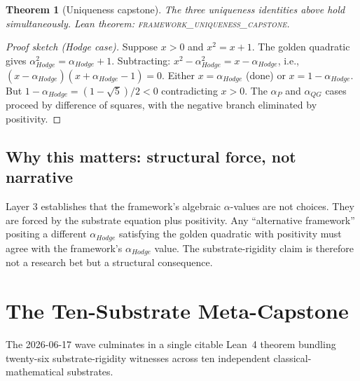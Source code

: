 \documentclass[11pt,a4paper]{amsart}
\theoremstyle{plain}
\newtheorem{theorem}{Theorem}[section]
\theoremstyle{definition}
\newcommand{\aP}{\alpha_{P}}
\newcommand{\aHodge}{\alpha_{Hodge}}
\newcommand{\aQG}{\alpha_{QG}}
\begin{document}
\begin{theorem}[Uniqueness capstone]
The three uniqueness identities above hold simultaneously. Lean
theorem: \textsc{framework\_uniqueness\_capstone}.
\end{theorem}

\begin{proof}[Proof sketch (Hodge case)]
Suppose $x > 0$ and $x^{2} = x + 1$. The golden quadratic gives
$\aHodge^{2} = \aHodge + 1$. Subtracting:
$x^{2} - \aHodge^{2} = x - \aHodge$, i.e.,
$(x - \aHodge)(x + \aHodge - 1) = 0$. Either $x = \aHodge$ (done) or
$x = 1 - \aHodge$. But $1 - \aHodge = (1 - \sqrt{5})/2 < 0$
contradicting $x > 0$. The $\aP$ and $\aQG$ cases proceed by
difference of squares, with the negative branch eliminated by
positivity.
\end{proof}

\subsection{Why this matters: structural force, not narrative}
Layer 3 establishes that the framework's algebraic $\alpha$-values are
not choices. They are forced by the substrate equation plus positivity.
Any ``alternative framework'' positing a different $\aHodge$
satisfying the golden quadratic with positivity must agree with the
framework's $\aHodge$ value. The substrate-rigidity claim is therefore
not a research bet but a structural consequence.

\section{The Ten-Substrate Meta-Capstone}
\label{sec:meta}

The 2026-06-17 wave culminates in a single citable Lean~4 theorem
bundling twenty-six substrate-rigidity witnesses across ten
independent classical-mathematical substrates.
\end{document}
